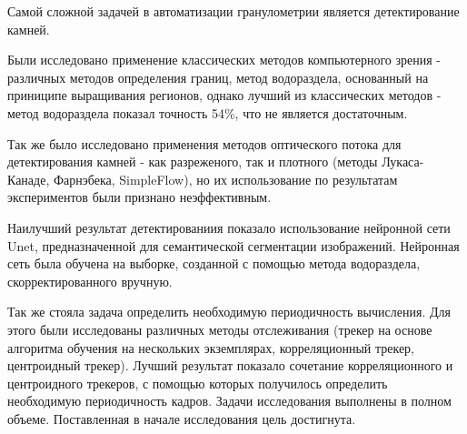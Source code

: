 \documentclass[times]{itmo-student-thesis}
\begin{document}
Самой сложной задачей в автоматизации гранулометрии является детектирование камней.

Были исследовано применение классических методов компьютерного зрения - различных методов определения границ, метод водораздела, основанный на приниципе выращивания регионов, однако лучший из классических методов - метод водораздела показал точность 54\%, что не является достаточным.

Так же было исследовано применения методов оптического потока для детектирования камней - как разреженого, так и плотного (методы Лукаса-Канаде, Фарнэбека, SimpleFlow), но их использование по результатам экспериментов были признано неэффективным.

Наилучший результат детектированиия показало использование нейронной сети Unet, предназначенной для семантической сегментации изображений. Нейронная сеть была обучена на выборке, созданной с помощью метода водораздела, скорректированного вручную.

Так же стояла задача определить необходимую периодичность вычисления. Для этого были исследованы различных методы отслеживания (трекер на основе алгоритма обучения на нескольких экземплярах, корреляционный трекер, центроидный трекер). Лучший результат показало сочетание корреляционного и центроидного трекеров, с помощью которых получилось определить необходимую периодичность кадров. 
Задачи исследования выполнены в полном объеме. Поставленная в начале исследования цель достигнута.

\printmainbibliography

\appendix
\end{document}
